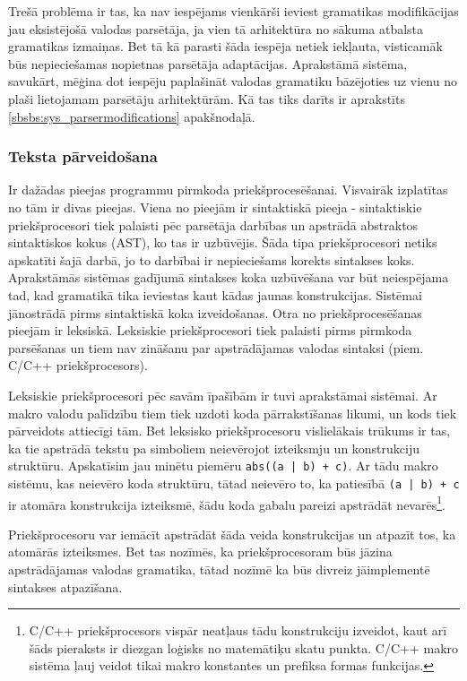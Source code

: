 Trešā problēma ir tas, ka nav iespējams vienkārši ieviest gramatikas modifikācijas jau eksistējošā valodas parsētāja, ja vien tā arhitektūra no sākuma atbalsta gramatikas izmaiņas. Bet tā kā parasti šāda iespēja netiek iekļauta, visticamāk būs nepieciešamas nopietnas parsētāja adaptācijas. Aprakstāmā sistēma, savukārt, mēģina dot iespēju paplašināt valodas gramatiku bāzējoties uz vienu no plaši lietojamam parsētāju arhitektūrām. Kā tas tiks darīts ir aprakstīts  \ref{sbsbs:sys_parsermodifications} apakšnodaļā.

\subsubsection{\label{sbsbs:sys_texttransform}Teksta pārveidošana}

Ir dažādas pieejas programmu pirmkoda priekšprocesēšanai. Visvairāk izplatītas no tām ir divas pieejas. Viena no pieejām ir sintaktiskā pieeja - sintaktiskie priekšprocesori tiek palaisti pēc parsētāja darbības un apstrādā abstraktos sintaktiskos kokus (AST), ko tas ir uzbūvējis. Šāda tipa priekšprocesori netiks apskatīti šajā darbā, jo to darbībai ir nepieciešams korekts sintakses koks. Aprakstāmās sistēmas gadījumā sintakses koka uzbūvēšana var būt neiespējama tad, kad gramatikā tika ieviestas kaut kādas jaunas konstrukcijas. Sistēmai jānostrādā pirms sintaktiskā koka izveidošanas. Otra no priekšprocesēšanas pieejām ir leksiskā. Leksiskie priekšprocesori tiek palaisti pirms pirmkoda parsēšanas un tiem nav zināšanu par apstrādājamas valodas sintaksi (piem. C/C++ priekšprocesors).

Leksiskie priekšprocesori pēc savām īpašībām ir tuvi aprakstāmai sistēmai. Ar makro valodu palīdzību tiem tiek uzdoti koda pārrakstīšanas likumi, un kods tiek pārveidots attiecīgi tām. Bet leksisko priekšprocesoru vislielākais trūkums ir tas, ka tie apstrādā tekstu pa simboliem neievērojot izteiksmju un konstrukciju struktūru. Apskatīsim jau minētu piemēru \verb/abs((a | b) + c)/. Ar tādu makro sistēmu, kas neievēro koda struktūru, tātad neievēro to, ka patiesībā \verb/(a | b) + c/ ir atomāra konstrukcija izteiksmē, šādu koda gabalu pareizi apstrādāt nevarēs\footnote{C/C++ priekšprocesors vispār neatļaus tādu konstrukciju izveidot, kaut arī šāds pieraksts ir diezgan loģisks no matemātiķu skatu punkta. C/C++ makro sistēma ļauj veidot tikai makro konstantes un prefiksa formas funkcijas.}.

Priekšprocesoru var iemācīt apstrādāt šāda veida konstrukcijas un atpazīt tos, ka atomārās izteiksmes. Bet tas nozīmēs, ka priekšprocesoram būs jāzina apstrādājamas valodas gramatika, tātad nozīmē ka būs divreiz jāimplementē sintakses atpazīšana.

